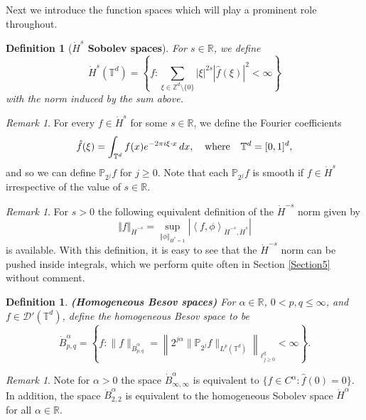 \documentclass[12pt,reqno,letterpaper]{amsart}
\numberwithin{equation}{section}
\newcommand{\1}{{\bf 1}}
\newcommand{\2}{{\bf 2}}
\newcommand{\R}{\mathbb R}
\newcommand{\T}{\mathbb T}
\newcommand{\Z}{\mathbb Z}
\newtheorem{definition}[theorem]{Definition}
\theoremstyle{remark}
\newtheorem{remark}[theorem]{Remark}
\theoremstyle{remark}
\begin{document}
Next we introduce the function spaces which will play a prominent role throughout.

\begin{definition}[\textbf{$\dot H^s$ Sobolev spaces}] For $s \in \mathbb{R}$, we define
    $$\dot{H}^{s}(\mathbb{T}^{d})=\left\{ f: \sum_{\xi \in \Z^d \setminus \{0\}}|\xi|^{2s}|\hat{f}(\xi)|^2<\infty\right\}  $$
    with the norm induced by the sum above.
\end{definition}
\begin{remark}
    For every $f\in \dot H^{s}$ for some $s\in \R$, we define the Fourier coefficients
    \[\hat{f}(\xi)=\int_{\T^{d}}f(x)e^{-2\pi i\xi\cdot x}\,dx, \hspace{0.25cm} \text{ where } \hspace{0.25cm} \T^{d}=[0,1]^{d},\]
    and so we can define $\mathbb{P}_{2^j}f$ for $j\geq 0$.  Note that each $\mathbb{P}_{2^j}f$ is smooth if $f\in \dot H^{s}$ irrespective of the value of $s\in \R$.
\end{remark}
\begin{remark}
    For $s > 0$ the following equivalent definition of the $\dot{H}^{-s}$ norm given by
    $$
        \Vert f \Vert_{\dot{H}^{-s}} = \sup_{\Vert \phi \Vert_{\dot{H}^s = 1}} \left|\left\langle f,\phi \right\rangle_{\dot{H}^{-s},\dot{H}^s}\right|
    $$
    is available. With this definition, it is easy to see that the $\dot{H}^{-s}$ norm can be pushed inside integrals, which we perform quite often in Section \ref{Section5} without comment.
\end{remark}


\begin{definition}{\textbf{(Homogeneous Besov spaces)}}
    For $\alpha \in \R$, $0<p,q\leq \infty$, and $f \in \mathcal{D}'(\T^d)$, define the homogeneous Besov space to be
    \[
        \dot{B}^{\alpha}_{p,q} = \left\{ f: \|f\|_{\dot{B}^{\alpha}_{p,q}} = \left\| 2^{j\alpha}\|\mathbb{P}_{2^j}f\|_{L^p(\T^d)}\right\|_{\ell^q_{j\geq 0}} <\infty \right\}.
    \]
\end{definition}
\begin{remark}
    Note for $\alpha > 0$ the space $\dot{B}^{\alpha}_{\infty,\infty}$ is equivalent to $\{f \in C^\alpha : \hat{f}(0) = 0\}$. In addition, the space $\dot{B}^{\alpha}_{2,2}$ is equivalent to the homogeneous Sobolev space $\dot{H}^\alpha$ for all $\alpha \in \R$.
\end{remark}
\end{document}
